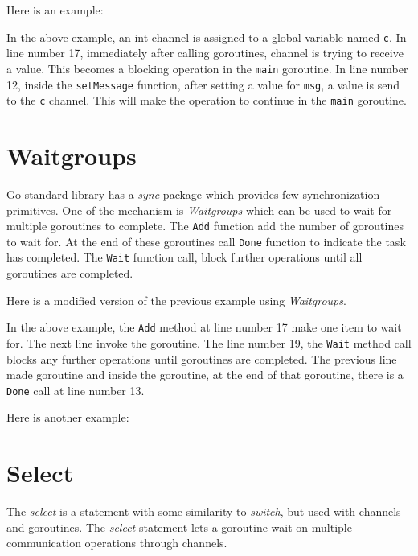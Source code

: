 Here is an example:



In the above example, an int channel is assigned to a global variable
named \texttt{c}.  In line number 17, immediately after calling
goroutines, channel is trying to receive a value.  This becomes a
blocking operation in the \texttt{main} goroutine.  In line number 12,
inside the \texttt{setMessage} function, after setting a value
for \texttt{msg}, a value is send to the \texttt{c} channel.  This
will make the operation to continue in the \texttt{main} goroutine.

\section{Waitgroups}

Go standard library has a \textit{sync} package which provides few
synchronization primitives.  One of the mechanism
is \textit{Waitgroups} which can be used to wait for
multiple goroutines to complete.  The \texttt{Add} function add the
number of goroutines to wait for.  At the end of these goroutines
call \texttt{Done} function to indicate the task has completed.
The \texttt{Wait} function call, block further operations until all
goroutines are completed.

Here is a modified version of the previous example
using \textit{Waitgroups}.



In the above example, the \texttt{Add} method at line number 17 make
one item to wait for.  The next line invoke the goroutine.  The line
number 19, the \texttt{Wait} method call blocks any further operations
until goroutines are completed.  The previous line made goroutine and
inside the goroutine, at the end of that goroutine, there is
a \texttt{Done} call at line number 13.

Here is another example:



\section{Select}

The \emph{select} is a statement with some similarity
to \emph{switch}, but used with channels and goroutines.
The \emph{select} statement lets a goroutine wait on multiple
communication operations through channels.

